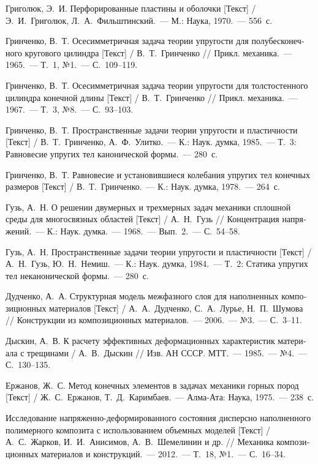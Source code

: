 \begin{russian}
\begin{biblist}{99}
Григолюк, Э.~И. 
Перфорированные пластины и оболочки [Текст] 
/ Э.~И.~Григолюк, Л.~А.~Фильштинский.~--- М.: Наука, 1970.~--- 556~с.

Гринченко, В.~Т. 
Осесимметричная задача теории упругости для полубесконечного кругового цилиндра [Текст] 
/ В.~Т.~Гринченко 
// Прикл. механика.~--- 1965.~--- Т.~1, №1.~--- С.~109--119.

Гринченко, В.~Т. 
Осесимметричная задача теории упругости для толстостенного цилиндра конечной длины [Текст] 
/ В.~Т.~Гринченко 
// Прикл. механика.~--- 1967.~--- Т.~3, №8.~--- С.~93--103.

Гринченко, В.~Т. 
Пространственные задачи теории упругости и пластичности [Текст] 
/ В.~Т.~Гринченко, А.~Ф.~Улитко.~---  К.: Наук. думка, 1985.~--- Т.~3: Равновесие упругих тел канонической формы.~--- 280~с.

Гринченко, В.~Т. 
Равновесие и установившиеся колебания упругих тел конечных размеров [Текст] 
/ В.~Т.~Гринченко.~--- К.: Наук. думка, 1978.~--- 264~с.

Гузь, А.~Н. 
О решении двумерных и трехмерных задач механики сплошной среды для многосвязных областей [Текст] 
/ А.~Н.~Гузь 
// Концентрация напряжений.~--- К.: Наук. думка.~--- 1968.~--- Вып.~2.~--- С.~54--58.

Гузь, А.~Н. 
Пространственные задачи теории упругости и пластичности [Текст] 
/ А.~Н.~Гузь, Ю.~Н.~Немиш.~--- К.: Наук. думка, 1984.~--- Т.~2: Статика упругих тел неканонической формы.~--- 280~с.

Дудченко, А.~А. 
Структурная модель межфазного слоя для наполненных композиционных материалов [Текст] 
/ А.~А.~Дудченко, С.~А.~Лурье, Н.~П.~Шумова 
// Конструкции из композиционных материалов.~--- 2006.~--- №3.~--- С.~3--11.

Дыскин, А.~В. 
К расчету эффективных деформационных характеристик материала с трещинами  
/ А.~В.~Дыскин 
// Изв. АН СССР. МТТ.~--- 1985.~--- №4.~--- С.~130--135.

Ержанов, Ж.~С. Метод конечных элементов в задачах механики горных пород [Текст] 
/ Ж.~С.~Ержанов, Т.~Д.~Каримбаев.~--- Алма-Ата: Наука, 1975.~--- 238~с.

Исследование напряженно-деформированного состояния дисперсно наполненного полимерного композита с использованием объемных моделей [Текст] 
/ А.~С.~Жарков, И.~И.~Анисимов, А.~В.~Шемелинин и др. 
// Механика композиционных материалов и конструкций.~--- 2012.~--- Т.~18, №1.~--- С.~16--34.


\end{biblist}
\end{russian}
